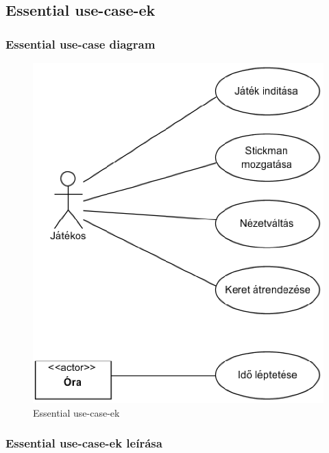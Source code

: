 \clearpage
\subsection{Essential use-case-ek}
	\subsubsection{Essential use-case diagram}
	
		\begin{figure}[h!]
			\begin{center}
				\includegraphics[scale=0.4]{resources/essential_use_cases.png}
				\caption{Essential use-case-ek}
			\end{center}
		\end{figure}
						
	\subsubsection{Essential use-case-ek leírása}
	
